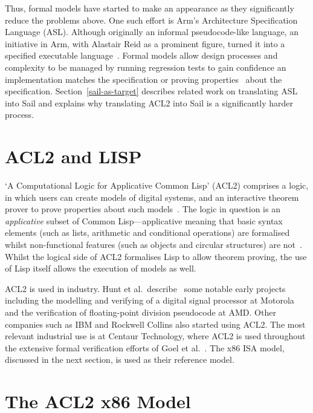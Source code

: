 \documentclass[a4paper,12pt,twoside,openright]{report}
\begin{document}
Thus, formal models have started to make an appearance as they significantly reduce the problems above.  One such effort is Arm's Architecture Specification Language (ASL).  Although originally an informal pseudocode-like language, an initiative in Arm, with Alastair Reid as a prominent figure, turned it into a specified executable language~\cite{background-asl}.  Formal models allow design processes and complexity to be managed by running regression tests to gain confidence an implementation matches the specification or proving properties~\cite{background-comp-arch-paper2} about the specification.  Section~\ref{sail-as-target} describes related work on translating ASL into Sail and explains why translating ACL2 into Sail is a significantly harder process.

\section{ACL2 and LISP}

`A Computational Logic for Applicative Common Lisp' (ACL2) comprises a logic, in which users can create models of digital systems, and an interactive theorem prover to prove properties about such models~\cite{background-acl2-homepage}.  The logic in question is an \emph{applicative} subset of Common Lisp---applicative meaning that basic syntax elements (such as lists, arithmetic and conditional operations) are formalised whilst non-functional features (such as objects and circular structures) are not~\cite{background-walking-tour-lisp}.  Whilst the logical side of ACL2 formalises Lisp to allow theorem proving, the use of Lisp itself allows the execution of models as well.

ACL2 is used in industry.  Hunt et al.~describe~\cite{background-ACL2-2017} some notable early projects including the modelling and verifying of a digital signal processor at Motorola and the verification of floating-point division pseudocode at AMD.  Other companies such as IBM and Rockwell Collins also started using ACL2.  The most relevant industrial use is at Centaur Technology, where ACL2 is used throughout the extensive formal verification efforts of Goel et al.~\cite{background-ACL2-2020}.  The x86 ISA model, discussed in the next section, is used as their reference model.

\section{The ACL2 x86 Model}
\end{document}
